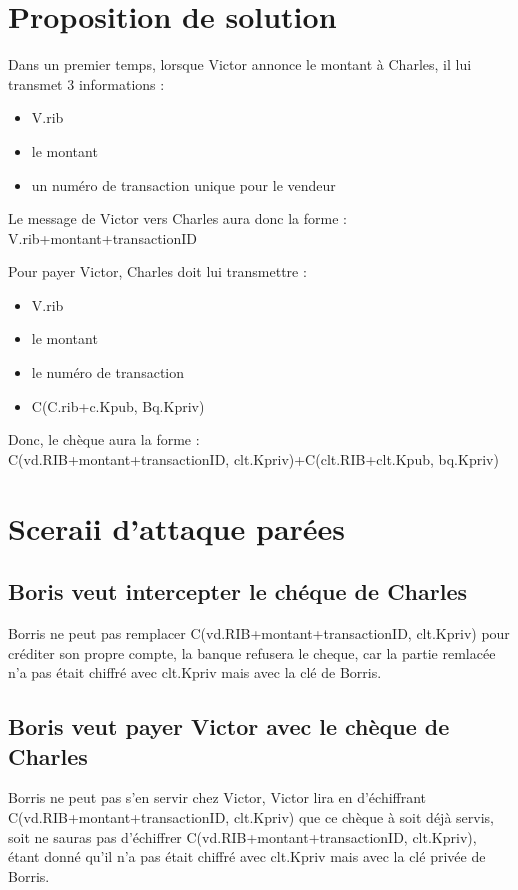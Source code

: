\documentclass[oneside,10pt]{article}
\begin{document}
\section{Proposition de solution}
Dans un premier temps, lorsque Victor annonce le montant \`a Charles, il lui transmet 3 informations :
\begin{itemize}
\item V.rib
\item le montant
\item un num\'ero de transaction unique pour le vendeur
\end{itemize}
Le message de Victor vers Charles aura donc la forme :\\V.rib+montant+transactionID


Pour payer Victor, Charles doit lui transmettre :
\begin{itemize}
\item V.rib
\item le montant
\item le num\'ero de transaction
\item C(C.rib+c.Kpub, Bq.Kpriv)
\end{itemize}
Donc, le ch\`eque aura la forme : \\C(vd.RIB+montant+transactionID, clt.Kpriv)+C(clt.RIB+clt.Kpub, bq.Kpriv)

\section{Sceraii d'attaque par\'ees}

\subsection{Boris veut intercepter le ch\'eque de Charles}
Borris ne peut pas remplacer C(vd.RIB+montant+transactionID, clt.Kpriv) pour cr\'editer son propre compte, la banque refusera le cheque, car la partie remlac\'ee n'a pas \'etait chiffr\'e avec clt.Kpriv mais avec la cl\'e de Borris.

\subsection{Boris veut payer Victor avec le ch\`eque de Charles}
Borris ne peut pas s'en servir chez Victor, Victor lira en d'\'echiffrant \\C(vd.RIB+montant+transactionID, clt.Kpriv) que ce ch\`eque \`a soit d\'ej\`a servis, soit ne sauras pas d'\'echiffrer C(vd.RIB+montant+transactionID, clt.Kpriv), \'etant donn\'e qu'il n'a pas \'etait chiffr\'e avec clt.Kpriv mais avec la cl\'e priv\'ee de Borris.
\end{document}
